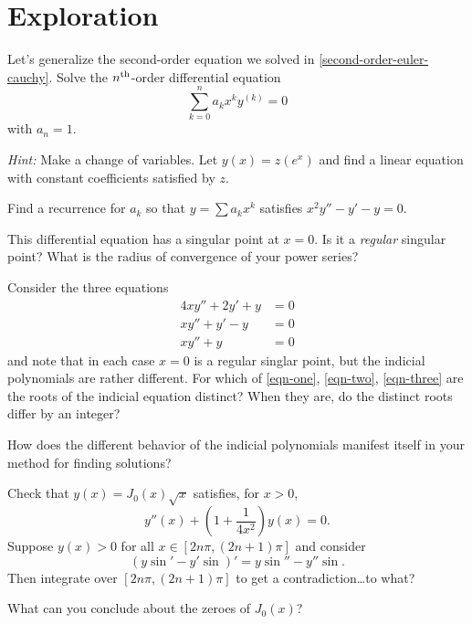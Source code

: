 \documentclass{homework}
\begin{document}
\section{Exploration}

\begin{problem}
  Let's generalize the second-order equation we solved in
  \ref{second-order-euler-cauchy}.  Solve the
  $n^{\mbox{\scriptsize th}}$-order differential equation
  \[
    \sum_{k=0}^n a_k x^k y^{(k)} = 0
  \]
  with $a_n = 1$.

  \textit{Hint:} Make a change of variables.  Let $y(x) = z(e^x)$ and
  find a linear equation with constant coefficients satisfied by $z$.
\end{problem}

\begin{problem}
  Find a recurrence for $a_k$ so that $y = \sum a_k x^k$ satisfies \(x^2 y'' - y' - y = 0\).

  This differential equation has a singular point at $x = 0$.  Is it a
  \textit{regular} singular point?  What is the radius of convergence
  of your power series?
\end{problem}

\begin{problem}
  Consider the three equations
  \begin{align}
    4xy'' + 2y' + y &= 0 \label{eqn-one}\\
    x y'' + y' - y &= 0 \label{eqn-two}\\
    x y'' + y &= 0 \label{eqn-three}
  \end{align}
  and note that in each case $x=0$ is a regular singlar point, but the
  indicial polynomials are rather different.  For which of
  \eqref{eqn-one}, \eqref{eqn-two}, \eqref{eqn-three} are the roots of
  the indicial equation distinct?  When they are, do the distinct
  roots differ by an integer?

  How does the different behavior of the indicial polynomials manifest
  itself in your method for finding solutions?
\end{problem}


\begin{problem}\label{finding-zeroes-of-bessel}Check that $y(x) = J_0(x) \sqrt{x}$ satisfies, for $x > 0$,
  \[
    y''(x) + \left( 1 + \frac{1}{4x^2} \right) y(x) = 0.
  \]
  Suppose $y(x) > 0$ for all $x \in [2 n \pi, (2n+1) \pi]$ and consider
  \[
    \left( y \sin' - y' \sin \right)' = y \sin '' - y'' \sin. %
  \]
  Then integrate over $[2n \pi, (2n+1) \pi]$ to get a
  contradiction\ldots to what?

  What can you conclude about the zeroes of $J_0(x)$?
\end{problem}
\end{document}
